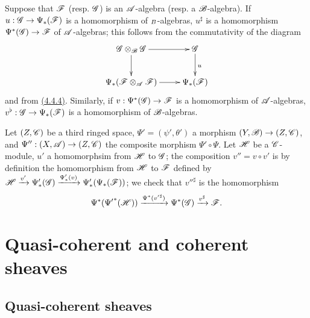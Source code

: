 \begin{env}[4.4.7]
\label{env-0.4.4.7}
Suppose that $\mathscr{F}$ (resp. $\mathscr{G}$) is an $\mathscr{A}$-algebra (resp. a $\mathscr{B}$-algebra). If
$u:\mathscr{G}\to\Psi_*(\mathscr{F})$ is a homomorphism of $\sb{B}$-algebras, $u^\sharp$ is a
homomorphism $\Psi^*(\mathscr{G})\to\mathscr{F}$ of $\mathscr{A}$-algebras; this follows from the
commutativity of the diagram
\[
  \xymatrix{
    \sh{G}\otimes_\sh{B}\sh{G}\ar[r]\ar[d] &
    \sh{G}\ar[d]^u\\
    \Psi_*(\sh{F}\otimes_\sh{A}\sh{F})\ar[r] &
    \Psi_*(\sh{F})
  }
\]
and from \hyperref[env-0.4.4.4]{(4.4.4)}. Similarly, if $v:\Psi^*(\mathscr{G})\to\mathscr{F}$ is a homomorphism of
$\mathscr{A}$-algebras, $v^\flat:\mathscr{G}\to\Psi_*(\mathscr{F})$ is a homomorphism of $\mathscr{B}$-algebras.
\end{env}

\begin{env}[4.4.8]
\label{env-0.4.4.8}
Let $(Z,\mathscr{C})$ be a third ringed space, $\Psi'=(\psi',\theta')$ a morphism
$(Y,\mathscr{B})\to(Z,\mathscr{C})$, and $\Psi'':(X,\mathscr{A})\to(Z,\mathscr{C})$ the composite morphism
$\Psi'\circ\Psi$. Let $\mathscr{H}$ be a $\mathscr{C}$-module, $u'$ a homomorphsim from $\mathscr{H}$ to
$\mathscr{G}$; the composition $v''=v\circ v'$ is by definition the homomorphism from $\mathscr{H}$ to
$\mathscr{F}$ defined by
$\mathscr{H}\xrightarrow{v'}\Psi_*'(\mathscr{G})\xrightarrow{\Psi_*'(v)}\Psi_*'(\Psi_*(\mathscr{F}))$; we
check that ${v''}^\sharp$ is the homomorphism
\[
  \Psi^*({\Psi'}^*(\mathscr{H}))\xrightarrow{\Psi^*({v'}^\sharp)}\Psi^*(\mathscr{G})
  \xrightarrow{v^\sharp}\mathscr{F}.
\]
\end{env}

\section{Quasi-coherent and coherent sheaves}
\label{section-qcoh-and-coh-sheaves}

\subsection{Quasi-coherent sheaves}
\label{subsection-qcoh-sheaves}

